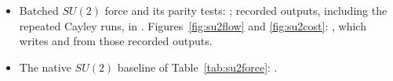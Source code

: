 \documentclass[11pt]{article}
\theoremstyle{definition}
\theoremstyle{remark}
\begin{document}
\begin{itemize}
     (slow and fast residual) and
     (Cayley step); recorded outputs in
    ,  and
    .
  \item Batched $SU(2)$ force and its parity tests: ;
    recorded outputs, including the repeated Cayley runs, in .
    Figures~\ref{fig:su2flow} and \ref{fig:su2cost}: , which
    writes  and  from those recorded outputs.
  \item The native $SU(2)$ baseline of Table~\ref{tab:su2force}:
    .
\end{itemize}
\end{document}
